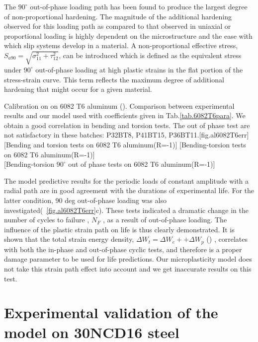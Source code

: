 \documentclass[3p,times,procedia,number]{elsarticle}
\newcommand{\figref}[1]{\figurename~\ref{#1}}
\begin{document}
The $90^\circ$ out-of-phase loading path has been found to produce the largest degree of non-proportional hardening. The magnitude of the additional hardening observed for this loading path as compared to that observed in uniaxial or proportional loading is highly dependent on the microstructure and the ease with which slip systems develop in a material. A non-proportional effective stress, $S_{a90}=\sqrt{\sigma_{11}^2+\tau_{12}^2}$, can be introduced which is defined as the equivalent stress under $90^\circ$ out-of-phase loading at high plastic strains in the flat portion of the stress-strain curve. This term reflects the maximum degree of additional hardening that might occur for a given material.



\begin{Figure}[!h]{Calibration on on 6082 T6 aluminum (\cite{susmel2003multiaxial}). Comparison between experimental results and our model used with coefficients given in Tab.\ref{tab.6082T6para}. We obtain a good correlation in bending and torsion tests. The out of phase test are not satisfactory in these batches: P32BT8, P41BT15, P36BT11.}[fig.al6082T6err]
	[Bending and torsion tests on 6082 T6 aluminum(R=-1)]
	[Bending-torsion tests on 6082 T6 aluminum(R=-1)]
	\\
	[Bending-torsion $90^\circ$ out of phase tests on 6082 T6 aluminum(R=-1)]
\end{Figure}

The model predictive results for the periodic loads of constant amplitude with a radial path are in good agreement with the durations of experimental life. For the latter condition, 90 deg out-of-phase loading was also investigated(\figref{fig.al6082T6err}c). These tests indicated a dramatic change in the number of cycles to failure , $N_F$ , as a result of out-of-phase loading. The influence of the plastic strain path on life is thus clearly demonstrated. It is shown that the total strain energy density, $ΔW_t = ΔW_e+ + ΔW_p$ (\cite{ellyin1991phase}) , correlates with both the in-phase and out-of-phase cyclic tests, and therefore is a proper damage parameter to be used for life predictions. Our microplasticity model does not take this strain path effect into account and we get inaccurate results on this test.



\clearpage
\section{Experimental validation of the model on 30NCD16 steel}
\end{document}
